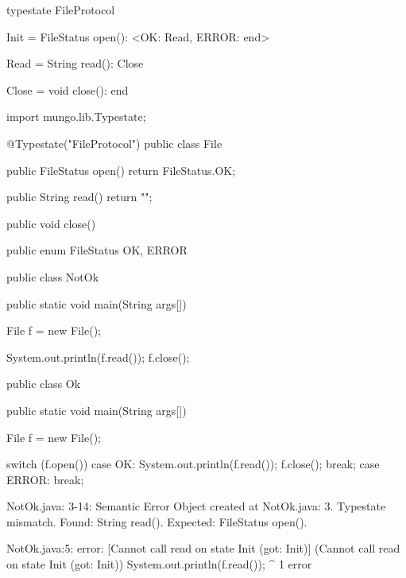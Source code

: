 \begin{code}
typestate FileProtocol {

  Init = {
    FileStatus open(): <OK: Read, ERROR: end>
  }

  Read = {
    String read(): Close
  }

  Close = {
    void close(): end
  }

}\end{code}

\begin{code}
import mungo.lib.Typestate;

@Typestate("FileProtocol")
public class File {

  public FileStatus open() {
    return FileStatus.OK;
  }

  public String read() {
    return "";
  }

  public void close() {

  }

}\end{code}

\begin{code}
public enum FileStatus {
  OK, ERROR
}\end{code}

\begin{code}
public class NotOk {
  public static void main(String args[]) {
    File f = new File();
    
    System.out.println(f.read());
    f.close();
  }
}\end{code}

\begin{code}
public class Ok {
  public static void main(String args[]) {
    File f = new File();

    switch (f.open()) {
      case OK:
        System.out.println(f.read());
        f.close();
        break;
      case ERROR:
        break;
    }
  }
}\end{code}

\lstset{language=,caption=Mungo's output}
\begin{code}

NotOk.java: 3-14: Semantic Error
		Object created at NotOk.java: 3. Typestate mismatch. Found: String read(). Expected: FileStatus open().
\end{code}

\lstset{language=,caption=Our tool's output}
\begin{code}
NotOk.java:5: error: [Cannot call read on state Init (got: Init)] (Cannot call read on state Init (got: Init))
    System.out.println(f.read());
                             ^
1 error
\end{code}

